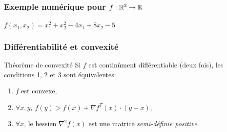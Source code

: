 \documentclass{beamer}
\newcommand{\R}{{\ensuremath\mathbb{R}}}
\begin{document}
\begin{frame}
  \frametitle{Exemple numérique pour $f:\R^2 \rightarrow \R$}

  \begin{block}{$f(x_1,x_2) = x_1^2 + x_2^2 - 4x_1 + 8x_2 - 5$}
  \end{block}
\end{frame}

\begin{frame}
  \frametitle{Différentiabilité et convexité}

  \begin{block}{Théorème de convexité}
    Si $f$ est continûment différentiable (deux fois), les conditions 1, 2 et 3 sont équivalentes:
    \begin{enumerate}
    \item $f$ est convexe,
    \item $\forall x, y, \ f(y) > f(x) + {\nabla f} ^T(x) \cdot (y - x)$,
    \item $\forall x$, le hessien $\nabla^2f(x)$ est une matrice \emph{semi-définie positive}.
    \end{enumerate}
  \end{block}

\end{frame}
\end{document}
